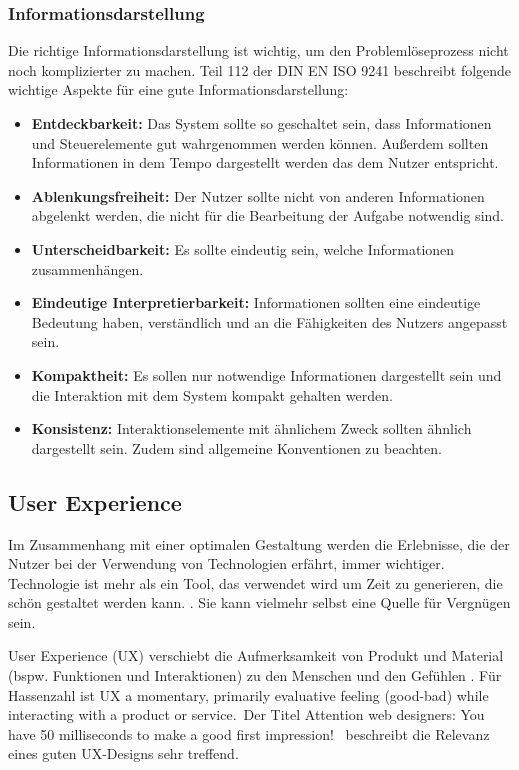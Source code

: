 \subsubsection*{Informationsdarstellung}
Die richtige Informationsdarstellung ist wichtig, um den Problemlöseprozess nicht noch komplizierter zu machen. Teil 112 \cite{ISO9241-112} der DIN EN ISO 9241 beschreibt folgende wichtige Aspekte für eine gute Informationsdarstellung:
\begin{itemize}
\item \textbf{Entdeckbarkeit:} Das System sollte so geschaltet sein, dass Informationen und Steuerelemente gut wahrgenommen werden können. Außerdem sollten Informationen in dem Tempo dargestellt werden das dem Nutzer entspricht.
\item \textbf{Ablenkungsfreiheit:} Der Nutzer sollte nicht von anderen Informationen abgelenkt werden, die nicht für die Bearbeitung der Aufgabe notwendig sind.
\item \textbf{Unterscheidbarkeit:} Es sollte eindeutig sein, welche Informationen zusammenhängen.
\item \textbf{Eindeutige Interpretierbarkeit:} Informationen sollten eine eindeutige Bedeutung haben, verständlich und an die Fähigkeiten des Nutzers angepasst sein.
\item \textbf{Kompaktheit:} Es sollen nur notwendige Informationen dargestellt sein und die Interaktion mit dem System kompakt gehalten werden.
\item \textbf{Konsistenz:} Interaktionselemente mit ähnlichem Zweck sollten ähnlich dargestellt sein. Zudem sind allgemeine Konventionen zu beachten.
\end{itemize}

\subsection{User Experience}
Im Zusammenhang mit einer optimalen Gestaltung werden die Erlebnisse, die der Nutzer bei der Verwendung von Technologien erfährt, immer wichtiger. Technologie ist mehr als ein Tool, das verwendet wird um Zeit zu generieren, die schön gestaltet werden kann. . Sie kann vielmehr selbst eine Quelle für Vergnügen sein. \cite{Hassenzahl2008}

User Experience (UX) verschiebt die Aufmerksamkeit von Produkt und Material (bspw. Funktionen und Interaktionen) zu den Menschen und den Gefühlen \cite{Hassenzahl2008}. Für Hassenzahl \citep[12]{Hassenzahl2008} ist UX \glqq a momentary, primarily evaluative feeling (good-bad) while interacting with a product or service.\grqq \ Der Titel \glqq Attention web designers: You have 50 milliseconds to make a good first impression!\grqq \ \citep[92]{Hassenzahl2006} beschreibt die Relevanz eines guten UX-Designs sehr treffend. 
\cite{Hassenzahl2006}

